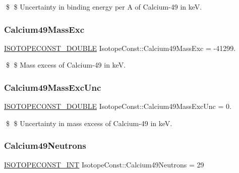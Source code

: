 \$ \$ Uncertainty in binding energy per A of Calcium-\/49 in keV. \mbox{\label{group___isotope_const-_calcium-_ca49_gac6f33ffee9a0ea4d837d079af5b2c681}} 
\subsubsection{\texorpdfstring{Calcium49\+Mass\+Exc}{Calcium49MassExc}}
{\footnotesize\ttfamily \mbox{\hyperlink{group___isotope_const-_macros_ga8f45a7272ce02c0b4c65c44636ed719a}{I\+S\+O\+T\+O\+P\+E\+C\+O\+N\+S\+T\+\_\+\+D\+O\+U\+B\+LE}} Isotope\+Const\+::\+Calcium49\+Mass\+Exc = -\/41299.}

\$ \$ Mass excess of Calcium-\/49 in keV. \mbox{\label{group___isotope_const-_calcium-_ca49_ga5c7730e934c7930a86443cda814409ca}} 
\subsubsection{\texorpdfstring{Calcium49\+Mass\+Exc\+Unc}{Calcium49MassExcUnc}}
{\footnotesize\ttfamily \mbox{\hyperlink{group___isotope_const-_macros_ga8f45a7272ce02c0b4c65c44636ed719a}{I\+S\+O\+T\+O\+P\+E\+C\+O\+N\+S\+T\+\_\+\+D\+O\+U\+B\+LE}} Isotope\+Const\+::\+Calcium49\+Mass\+Exc\+Unc = 0.}

\$ \$ Uncertainty in mass excess of Calcium-\/49 in keV. \mbox{\label{group___isotope_const-_calcium-_ca49_ga1460ac1f0fcb5cb558f46b4c9f1b8f87}} 
\subsubsection{\texorpdfstring{Calcium49\+Neutrons}{Calcium49Neutrons}}
{\footnotesize\ttfamily \mbox{\hyperlink{group___isotope_const-_macros_ga5f18360b3e99483a35c32d789e62621c}{I\+S\+O\+T\+O\+P\+E\+C\+O\+N\+S\+T\+\_\+\+I\+NT}} Isotope\+Const\+::\+Calcium49\+Neutrons = 29}

